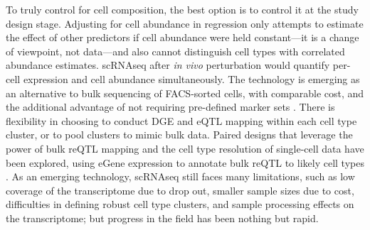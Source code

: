 To truly control for cell composition, the best option is to control it at the study design stage.
Adjusting for cell abundance in regression only attempts to estimate the effect of other predictors if cell abundance were held constant---it is a change of viewpoint, not data---and also cannot distinguish cell types with correlated abundance estimates.
\Gls{scRNAseq} after \textit{in vivo} perturbation would quantify per-cell expression and cell abundance simultaneously.
The technology is emerging as an alternative to bulk sequencing of \gls{FACS}-sorted cells, with comparable cost,
and the additional advantage of not requiring pre-defined marker sets \autocite{vanderwijst2020SinglecellEQTLGenConsortium}.
There is flexibility in choosing to conduct \gls{DGE} and \gls{eQTL} mapping within each cell type cluster, or to pool clusters to mimic bulk data.
Paired designs that leverage the power of bulk \gls{reQTL} mapping and the cell type resolution of single-cell data have been explored,
using eGene expression to annotate bulk \gls{reQTL} to likely cell types \autocite{devries2020IntegratingGWASBulk}.
As an emerging technology, \gls{scRNAseq} still faces many limitations, such as
    low coverage of the transcriptome due to drop out, 
    smaller sample sizes due to cost,
    difficulties in defining robust cell type clusters,
    and sample processing effects on the transcriptome;
but progress in the field has been nothing but rapid.

%
%
%
%

